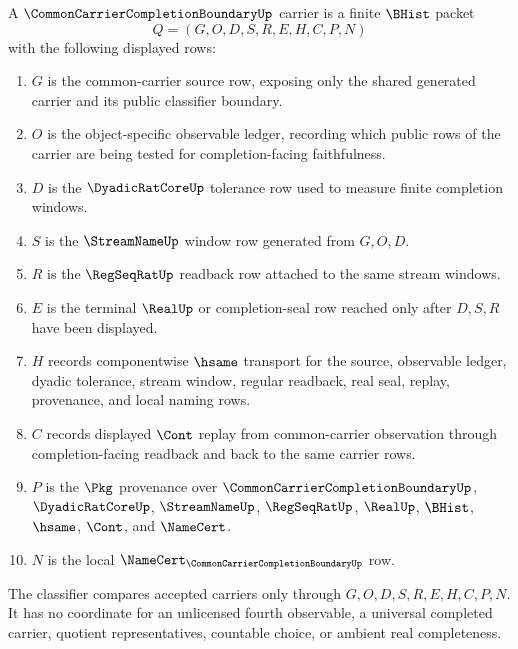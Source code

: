 \begin{definition}
\label{def:common-carrier-completion-boundary-carrier}
A $\CommonCarrierCompletionBoundaryUp$ carrier is a finite $\BHist$ packet
$$
Q=(G,O,D,S,R,E,H,C,P,N)
$$
with the following displayed rows:
\begin{enumerate}
\item $G$ is the common-carrier source row, exposing only the shared generated carrier and its public classifier boundary.
\item $O$ is the object-specific observable ledger, recording which public rows of the carrier are being tested for completion-facing faithfulness.
\item $D$ is the $\DyadicRatCoreUp$ tolerance row used to measure finite completion windows.
\item $S$ is the $\StreamNameUp$ window row generated from $G,O,D$.
\item $R$ is the $\RegSeqRatUp$ readback row attached to the same stream windows.
\item $E$ is the terminal $\RealUp$ or completion-seal row reached only after $D,S,R$ have been displayed.
\item $H$ records componentwise $\hsame$ transport for the source, observable ledger, dyadic tolerance, stream window, regular readback, real seal, replay, provenance, and local naming rows.
\item $C$ records displayed $\Cont$ replay from common-carrier observation through completion-facing readback and back to the same carrier rows.
\item $P$ is the $\Pkg$ provenance over $\CommonCarrierCompletionBoundaryUp$, $\DyadicRatCoreUp$, $\StreamNameUp$, $\RegSeqRatUp$, $\RealUp$, $\BHist$, $\hsame$, $\Cont$, and $\NameCert$.
\item $N$ is the local $\NameCert_{\CommonCarrierCompletionBoundaryUp}$ row.
\end{enumerate}
The classifier compares accepted carriers only through $G,O,D,S,R,E,H,C,P,N$. It has no coordinate for an unlicensed fourth observable, a universal completed carrier, quotient representatives, countable choice, or ambient real completeness.
\end{definition}

